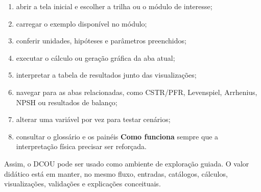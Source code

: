 \begin{enumerate}
    \item abrir a tela inicial e escolher a trilha ou o módulo de interesse;
    \item carregar o exemplo disponível no módulo;
    \item conferir unidades, hipóteses e parâmetros preenchidos;
    \item executar o cálculo ou geração gráfica da aba atual;
    \item interpretar a tabela de resultados junto das visualizações;
    \item navegar para as abas relacionadas, como CSTR/PFR, Levenspiel, Arrhenius, NPSH ou resultados de balanço;
    \item alterar uma variável por vez para testar cenários;
    \item consultar o glossário e os painéis \textbf{Como funciona} sempre que a interpretação física precisar ser reforçada.
\end{enumerate}

Assim, o DCOU pode ser usado como ambiente de exploração guiada. O valor didático está em manter, no mesmo fluxo, entradas, catálogos, cálculos, visualizações, validações e explicações conceituais.
